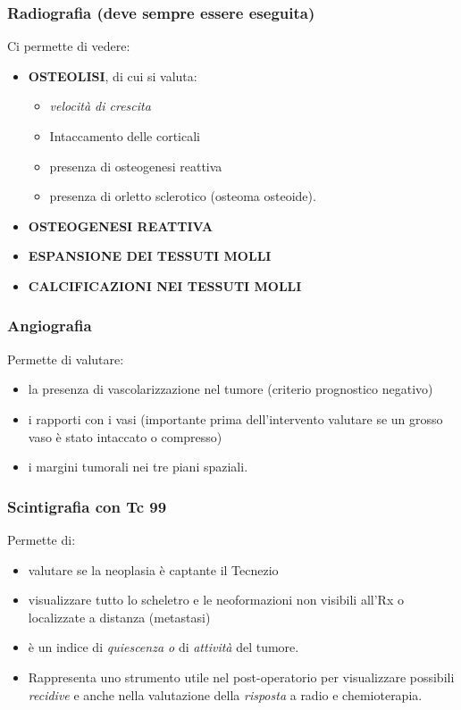 \subsubsection{Radiografia (deve sempre essere eseguita)}

Ci permette di vedere:

\begin{itemize}
\item
  \textbf{OSTEOLISI}, di cui si valuta:
\begin{itemize}
\item
  \emph{velocità di crescita}
\item
  Intaccamento delle corticali
\item
  presenza di osteogenesi reattiva
\item
  presenza di orletto sclerotico (osteoma osteoide).
\end{itemize}
\item \textbf{OSTEOGENESI REATTIVA}
\item \textbf{ESPANSIONE DEI TESSUTI MOLLI}
\item \textbf{CALCIFICAZIONI NEI TESSUTI MOLLI}
\end{itemize}

\subsubsection{Angiografia}

Permette di valutare:

\begin{itemize}
\item
  la presenza di vascolarizzazione nel tumore (criterio prognostico negativo)
\item
  i rapporti con i vasi (importante prima dell'intervento valutare se un grosso vaso è stato intaccato o compresso)
\item
  i margini tumorali nei tre piani spaziali.
\end{itemize}

\subsubsection{Scintigrafia con Tc 99}

Permette di:

\begin{itemize}
\item
  valutare se la neoplasia è captante il Tecnezio
\item
  visualizzare tutto lo scheletro e le neoformazioni non visibili all'Rx o localizzate a distanza (metastasi)
\item
  è un indice di \emph{quiescenza o} di \emph{attività} del tumore.
\item
  Rappresenta uno strumento utile nel post-operatorio per visualizzare possibili \emph{recidive} e anche nella valutazione della \emph{risposta} a radio e chemioterapia.
\end{itemize}

